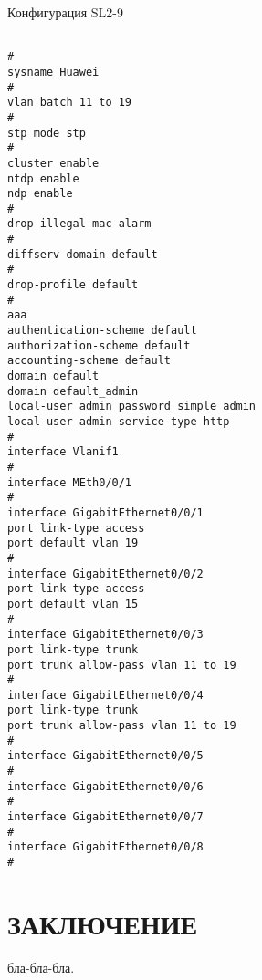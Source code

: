 \documentclass[14pt, a4paper]{extarticle}
\begin{document}
\begin{listing}[H]
\caption{Конфигурация SL2-9\label{list:sl2_9}}
\begin{Verbatim}[frame=single, fontsize=\footnotesize]

#
sysname Huawei
#
vlan batch 11 to 19
#
stp mode stp
#
cluster enable
ntdp enable
ndp enable
#
drop illegal-mac alarm
#
diffserv domain default
#
drop-profile default
#
aaa 
authentication-scheme default
authorization-scheme default
accounting-scheme default
domain default 
domain default_admin 
local-user admin password simple admin
local-user admin service-type http
#
interface Vlanif1
#
interface MEth0/0/1
#
interface GigabitEthernet0/0/1
port link-type access
port default vlan 19
#
interface GigabitEthernet0/0/2
port link-type access
port default vlan 15
#
interface GigabitEthernet0/0/3
port link-type trunk
port trunk allow-pass vlan 11 to 19
#
interface GigabitEthernet0/0/4
port link-type trunk
port trunk allow-pass vlan 11 to 19
#
interface GigabitEthernet0/0/5
#
interface GigabitEthernet0/0/6
#
interface GigabitEthernet0/0/7
#
interface GigabitEthernet0/0/8
#
\end{Verbatim}
\end{listing}
\newpage


\newpage



\section*{ЗАКЛЮЧЕНИЕ} 
бла-бла-бла.

\begingroup
\let\itshape\upshape
\sloppy
\printbibliography[title=СПИСОК ИСПОЛЬЗУЕМЫХ ИСТОЧНИКОВ]
\endgroup
\end{document}
